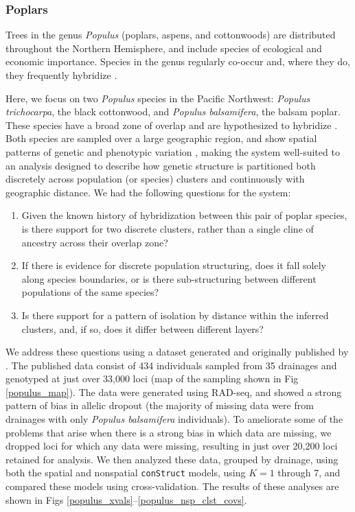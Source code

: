 \documentclass[12pt]{article}
\begin{document}
\subsubsection*{Poplars}

Trees in the genus \textit{Populus} (poplars, aspens, and cottonwoods) 
are distributed throughout the Northern Hemisphere, 
and include species of ecological and economic importance.
Species in the genus regularly co-occur and, 
where they do, they frequently hybridize \citep{eckenwalder1984, Cronk2005}.

Here, we focus on two \textit{Populus} species in the Pacific Northwest: 
\textit{Populus trichocarpa}, the black cottonwood,
and \textit{Populus balsamifera}, the balsam poplar.
These species have a broad zone of overlap and are hypothesized to hybridize \citep{geraldes_etal_2014, suarezgonzalez_etal_2016}.
Both species are sampled over a large geographic region, 
and show spatial patterns of genetic and phenotypic variation \citep{slavov_etal_2012, mckown_etal_2013},
making the system well-suited to an analysis designed to describe
how genetic structure is partitioned both discretely across population (or species) clusters
and continuously with geographic distance.
We had the following questions for the system: 
\begin{enumerate}
\item Given the known history of hybridization between this pair of poplar species, 
is there support for two discrete clusters, 
rather than a single cline of ancestry across their overlap zone?
\item If there is evidence for discrete population structuring, 
does it fall solely along species boundaries, 
or is there sub-structuring between different populations of the same species?
\item Is there support for a pattern of isolation by distance within
the inferred clusters, and, if so, 
does it differ between different layers?
\end{enumerate}

We address these questions using a dataset generated and originally published by \cite{geraldes_etal_2014}.
The published data consist of 434 individuals sampled from 35 drainages 
and genotyped at just over 33,000 loci (map of the sampling shown in Fig \ref{populus_map}).
The data were generated using RAD-seq, 
and showed a strong pattern of bias in allelic dropout 
(the majority of missing data were from drainages with only \textit{Populus balsamifera} individuals).
To ameliorate some of the problems that arise when there is a strong bias in which data are missing, 
we dropped loci for which any data were missing, 
resulting in just over 20,200 loci retained for analysis.  
We then analyzed these data, grouped by drainage, using both the spatial and nonspatial \texttt{conStruct} models, 
using $K = 1$ through 7,
and compared these models using cross-validation.
The results of these analyses are shown in 
Figs \ref{populus_xvals}--\ref{populus_nsp_clst_covs}. %
\end{document}
